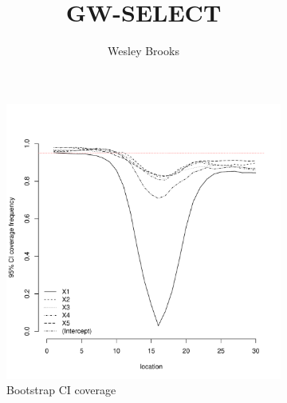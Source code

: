 \documentclass[authoryear, review, 11pt]{elsarticle}
\title{GW-SELECT}
\author{Wesley Brooks}
\date{}                                           %
\begin{document}
\maketitle

\begin{figure}
	\vspace{-30mm}
	\centering
	\begin{subfigure}[b]{0.45\textwidth}
	\centering
		\includegraphics[width=\textwidth]{../../figures/simulation/15.1.profile_bootstrap_coverage.pdf}
		\caption{Bootstrap CI coverage}
	\end{subfigure}%
	~ %
	\begin{subfigure}[b]{0.45\textwidth}
	\centering

\end{subfigure}
\end{figure}
\end{document}
